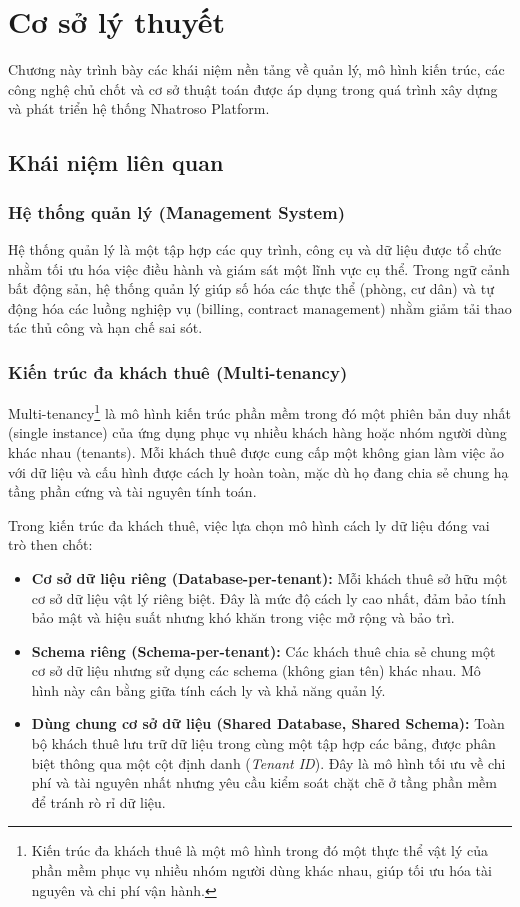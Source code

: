 \chapter{Cơ sở lý thuyết}\label{chapter_theory}

Chương này trình bày các khái niệm nền tảng về quản lý, mô hình kiến trúc, các công nghệ chủ chốt và cơ sở thuật toán được áp dụng trong quá trình xây dựng và phát triển hệ thống Nhatroso Platform.

\section{Khái niệm liên quan}

\subsection{Hệ thống quản lý (Management System)}
Hệ thống quản lý là một tập hợp các quy trình, công cụ và dữ liệu được tổ chức nhằm tối ưu hóa việc điều hành và giám sát một lĩnh vực cụ thể. Trong ngữ cảnh bất động sản, hệ thống quản lý giúp số hóa các thực thể (phòng, cư dân) và tự động hóa các luồng nghiệp vụ (billing, contract management) nhằm giảm tải thao tác thủ công và hạn chế sai sót.

\subsection{Kiến trúc đa khách thuê (Multi-tenancy)}
Multi-tenancy\footnote{Kiến trúc đa khách thuê là một mô hình trong đó một thực thể vật lý của phần mềm phục vụ nhiều nhóm người dùng khác nhau, giúp tối ưu hóa tài nguyên và chi phí vận hành.} \cite{MultiTenancyPrinciples} là mô hình kiến trúc phần mềm trong đó một phiên bản duy nhất (single instance) của ứng dụng phục vụ nhiều khách hàng hoặc nhóm người dùng khác nhau (tenants). Mỗi khách thuê được cung cấp một không gian làm việc ảo với dữ liệu và cấu hình được cách ly hoàn toàn, mặc dù họ đang chia sẻ chung hạ tầng phần cứng và tài nguyên tính toán.

Trong kiến trúc đa khách thuê, việc lựa chọn mô hình cách ly dữ liệu đóng vai trò then chốt:
\begin{itemize}
    \item \textbf{Cơ sở dữ liệu riêng (Database-per-tenant):} Mỗi khách thuê sở hữu một cơ sở dữ liệu vật lý riêng biệt. Đây là mức độ cách ly cao nhất, đảm bảo tính bảo mật và hiệu suất nhưng khó khăn trong việc mở rộng và bảo trì.
    \item \textbf{Schema riêng (Schema-per-tenant):} Các khách thuê chia sẻ chung một cơ sở dữ liệu nhưng sử dụng các schema (không gian tên) khác nhau. Mô hình này cân bằng giữa tính cách ly và khả năng quản lý.
    \item \textbf{Dùng chung cơ sở dữ liệu (Shared Database, Shared Schema):} Toàn bộ khách thuê lưu trữ dữ liệu trong cùng một tập hợp các bảng, được phân biệt thông qua một cột định danh (\textit{Tenant ID}). Đây là mô hình tối ưu về chi phí và tài nguyên nhất nhưng yêu cầu kiểm soát chặt chẽ ở tầng phần mềm để tránh rò rỉ dữ liệu.
\end{itemize}

